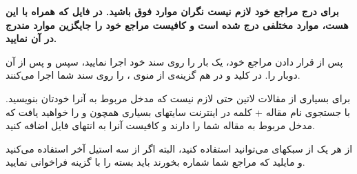 \textbf{برای درج مراجع خود لازم نیست نگران موارد فوق باشید. در فایل 
 که همراه با این \پ هست، موارد مختلفی درج شده است و کافیست مراجع خود را جایگزین موارد مندرج در آن نمایید.
}

پس از قرار دادن مراجع خود، یک بار  را روی سند خود اجرا نمایید، سپس  و پس از آن دوبار  را. در  کلید  و در  هم گزینه‌ی  از منوی ،  را روی سند شما اجرا می‌کنند.

برای بسیاری از مقالات لاتین حتی لازم نیست که مدخل مربوط به آنرا خودتان بنویسید. با جستجوی نام مقاله + کلمه   در اینترنت سایتهای بسیاری همچون  و  را خواهید یافت که مدخل  مربوط به مقاله شما را دارند و کافیست آنرا به انتهای فایل  اضافه کنید.

از هر یک از سبکهای  می‌توانید استفاده کنید، البته اگر از سه استیل آخر استفاده می‌کنید و مایلید که مراجع شما شماره بخورند باید بسته  را با گزینه  فراخوانی نمایید.
